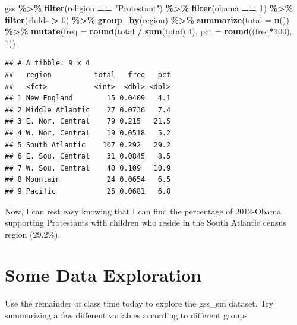 \documentclass[
]{book}
\newenvironment{Shaded}{\begin{snugshade}}{\end{snugshade}}
\newcommand{\AttributeTok}[1]{\textcolor[rgb]{0.13,0.29,0.53}{#1}}
\newcommand{\DecValTok}[1]{\textcolor[rgb]{0.00,0.00,0.81}{#1}}
\newcommand{\FunctionTok}[1]{\textcolor[rgb]{0.13,0.29,0.53}{\textbf{#1}}}
\newcommand{\NormalTok}[1]{#1}
\newcommand{\SpecialCharTok}[1]{\textcolor[rgb]{0.81,0.36,0.00}{\textbf{#1}}}
\newcommand{\StringTok}[1]{\textcolor[rgb]{0.31,0.60,0.02}{#1}}
\begin{document}
\begin{Shaded}
\begin{Highlighting}[]
\NormalTok{gss }\SpecialCharTok{\%\textgreater{}\%}
  \FunctionTok{filter}\NormalTok{(religion }\SpecialCharTok{==} \StringTok{"Protestant"}\NormalTok{) }\SpecialCharTok{\%\textgreater{}\%}
  \FunctionTok{filter}\NormalTok{(obama }\SpecialCharTok{==} \DecValTok{1}\NormalTok{) }\SpecialCharTok{\%\textgreater{}\%}
  \FunctionTok{filter}\NormalTok{(childs }\SpecialCharTok{\textgreater{}} \DecValTok{0}\NormalTok{) }\SpecialCharTok{\%\textgreater{}\%}
  \FunctionTok{group\_by}\NormalTok{(region) }\SpecialCharTok{\%\textgreater{}\%}
  \FunctionTok{summarize}\NormalTok{(}\AttributeTok{total =} \FunctionTok{n}\NormalTok{()) }\SpecialCharTok{\%\textgreater{}\%}
  \FunctionTok{mutate}\NormalTok{(}\AttributeTok{freq =} \FunctionTok{round}\NormalTok{(total }\SpecialCharTok{/} \FunctionTok{sum}\NormalTok{(total),}\DecValTok{4}\NormalTok{),}
         \AttributeTok{pct =} \FunctionTok{round}\NormalTok{((freq}\SpecialCharTok{*}\DecValTok{100}\NormalTok{), }\DecValTok{1}\NormalTok{))}
\end{Highlighting}
\end{Shaded}

\begin{verbatim}
## # A tibble: 9 x 4
##   region          total   freq   pct
##   <fct>           <int>  <dbl> <dbl>
## 1 New England        15 0.0409   4.1
## 2 Middle Atlantic    27 0.0736   7.4
## 3 E. Nor. Central    79 0.215   21.5
## 4 W. Nor. Central    19 0.0518   5.2
## 5 South Atlantic    107 0.292   29.2
## 6 E. Sou. Central    31 0.0845   8.5
## 7 W. Sou. Central    40 0.109   10.9
## 8 Mountain           24 0.0654   6.5
## 9 Pacific            25 0.0681   6.8
\end{verbatim}

Now, I can rest easy knowing that I can find the percentage of 2012-Obama supporting Protestants with children who reside in the South Atlantic census region (29.2\%).

\hypertarget{some-data-exploration}{%
\section{Some Data Exploration}\label{some-data-exploration}}

Use the remainder of class time today to explore the gss\_sm dataset. Try summarizing a few different variables according to different groups

  
\end{document}
